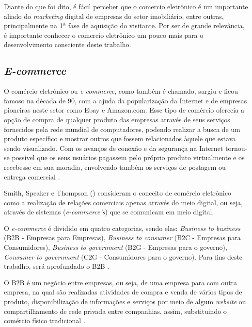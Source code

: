 Diante do que foi dito, é fácil perceber que o comercio eletrônico é um importante aliado do \textit{marketing} digital de empresas do setor imobiliário, entre outras, principalmente na 1ª fase de aquisição do visitante. Por ser de grande relevância, é importante conhecer o comercio eletrônico um pouco mais para o desenvolvimento consciente deste trabalho.

\subsection{\textit{E-commerce}}

O comércio eletrônico ou \textit{e-commerce}, como também é chamado, surgiu e ficou famoso na década de 90, com a ajuda da popularização da Internet e de empresas pioneiras neste setor como Ebay e Amazon.com. Esse tipo de comércio oferecia a opção de compra de qualquer produto das empresas através de seus serviços fornecidos pela rede mundial de computadores, podendo realizar a busca de um produto específico e mostrar outros que fossem relacionados àquele que estava sendo visualizado. Com os avanços de conexão e da segurança na Internet tornou-se possível que os seus usuários pagassem pelo próprio produto virtualmente e os recebesse em sua moradia, envolvendo também os serviços de postagem ou entrega comercial \cite{Nakamura:2011}.

Smith, Speaker e Thompson (\citeyear{smith2000mais}) consideram o conceito de comércio eletrônico como a realização de relações comerciais apenas através do meio digital, ou seja, através de sistemas (\textit{e-commerce's}) que se comunicam em meio digital.

O \textit{e-commerce} é dividido em quatro categorias, sendo elas: \textit{Business to business} (B2B - Empresas para Empresas), \textit{Business to consumer} (B2C - Empresas para Consumidores), \textit{Business to government} (B2G - Empresas para o governo), \textit{Consumer to government} (C2G - Consumidores para o governo). Para fins deste trabalho, será aprofundado o B2B \cite{Nakamura:2011}.

O B2B é um negócio entre empresas, ou seja, de uma empresa para com outra empresa, na qual são realizadas atividades de compra e venda de vários tipos de produto, disponibilização de informações e serviços por meio de algum \textit{website} ou compartilhamento de rede privada entre companhias, assim, substituindo o comércio físico tradicional \cite{Nakamura:2011}.

